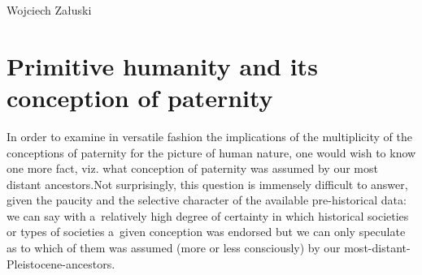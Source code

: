 \begin{artengenv}{Wojciech Załuski}
\section{Primitive humanity and its conception of paternity }\label{zal:sec3}
In order to examine in versatile fashion the implications of the multiplicity of the conceptions of paternity for the picture of human nature, one would wish to know one more fact, viz. what conception of paternity was assumed by our most distant ancestors.Not surprisingly, this question is immensely difficult to answer, given the paucity and the selective character of the available pre-historical data: we can say with a~relatively high degree of certainty in which historical societies or types of societies a~given conception was endorsed but we can only speculate as to which of them was assumed (more or less consciously) by our most-distant-Pleistocene-ancestors.


\end{artengenv}
